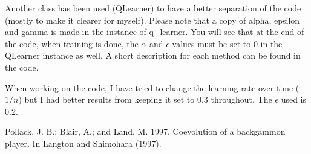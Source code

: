 \documentclass[12pt,a4paper]{article}
\begin{document}
Another class has been used (QLearner) to have a better separation of the code (mostly to make it clearer for myself). Please note that a copy of alpha, epsilon and gamma is made in the instance of q\_learner. You will see that at the end of the code, when training is done, the $\alpha$ and $\epsilon$ values must be set to $0$ in the QLearner instance as well. 
A short description for each method can be found in the code.

When working on the code, I have tried to change the learning rate over time ($1/n$) but I had better results from keeping it set to 0.3 throughout. The $\epsilon$ used is 0.2.

\begin{thebibliography}{9}
Pollack, J. B.; Blair, A.; and Land, M. 1997. Coevolution of a backgammon player. In Langton and Shimohara (1997).
\end{thebibliography}
\end{document}

